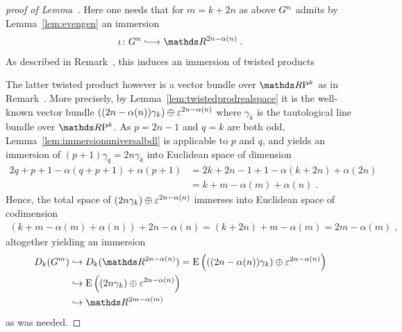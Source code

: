 \begin{proof}[proof of
  Lemma~]
  Here one needs that for $m=k+2n$ as above $G^{n}$ admits by
  Lemma~\ref{lem:evengen} an immersion
  \begin{gather*}
    \iota\colon\G n \immlongto \R^{2n-\alpha(n)}
    \;.
  \end{gather*}
  As described in
  Remark~,
  this induces an immersion of twisted products
  \begin{center}
  \end{center}
  The latter twisted product however is a vector bundle over
  $\RP{k}$ as in
  Remark~.
  More precisely, by Lemma~\ref{lem:twistedprodrealspace} it is the
  well-known vector bundle 
  $((2n-\alpha(n))\gamma_{k})\oplus\varepsilon^{2n-\alpha(n)}$
  where $\gamma_{k}$
  is the tautological line bundle over $\RP k$.
  As $p=2n-1$ and $q=k$ are both odd, 
  Lemma~\ref{lem:immersionuniversalbdl} is applicable to $p$ and $q$,
  and yields an immersion of $(p+1)\gamma_q = 2n\gamma_k$ into
  Euclidean space of dimension
  \begin{align*}
    2q+p+1-\alpha(q+p+1) + \alpha(p+1)
    &= 2k + 2n - 1 + 1 - \alpha(k+2n) + \alpha(2n) \\
    &= k + m - \alpha(m) + \alpha(n)
    \;.
  \end{align*}
  Hence, the total space of
  $(2n\gamma_k)\oplus\varepsilon^{2n-\alpha(n)}$
  immerses into Euclidean space of codimension
  \begin{gather*}
    \left(k + m - \alpha(m) + \alpha(n)\right)
    + 2n-\alpha(n)
    = (k+2n) + m - \alpha(m)
    = 2m - \alpha(m)
    \;,
  \end{gather*}
  altogether yielding an immersion
  \begin{align*}
    \Twistedprod{k}{\G m}
    &\immto
    \Twistedprod{k}{\R^{2n-\alpha(n)}}
    = \E\left(((2n-\alpha(n))\gamma_k)\oplus\trivbdl^{2n-\alpha(n)}\right)
    \\
    &\immto 
    \E\left((2n\gamma_k)\oplus\trivbdl^{2n-\alpha(n)}\right)
    \\
    &\immto
    \R^{2m-\alpha(m)}
  \end{align*}
  as was needed.
\end{proof}


